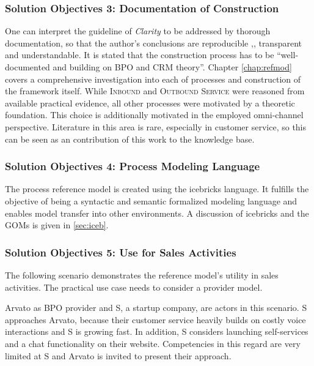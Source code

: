 \subsubsection{Solution Objectives 3: Documentation of Construction}
One can interpret the guideline of \textit{Clarity} to be addressed by thorough documentation, so that the author's conclusions are reproducible ,\eg, transparent and understandable.  
It is stated that the construction process has to be \enquote{well-documented and building on \acrshort{BPO} and \acrshort{CRM} theory}. Chapter \ref{chap:refmod} covers a comprehensive investigation into each of processes and construction of the framework itself. While \textsc{Inbound} and \textsc{Outbound Service} were reasoned from available practical evidence, all other processes were motivated by a theoretic foundation. This choice is additionally motivated in the employed omni-channel perspective. Literature in this area is rare, especially in customer service, so this can be seen as an  contribution of this work to the knowledge base. 

\subsubsection{Solution Objectives 4: Process Modeling Language }
The process reference model is created using the icebricks language. It fulfills the objective of being a syntactic and semantic formalized modeling language and enables model transfer into other environments. A discussion of icebricks and the \acrshort{GOM}s is given in \ref{sec:iceb}. 

\subsubsection{Solution Objectives 5: Use for Sales Activities}

The following scenario demonstrates the reference model's utility in sales activities. The practical use case needs to consider a provider model.  

Arvato as BPO provider and S, a startup company, are actors in this scenario. S approaches Arvato, because their customer service heavily builds on costly voice interactions and S is growing fast. In addition, S considers launching self-services and a chat functionality on their website. Competencies in this regard are very limited at S and Arvato is invited to present their approach. 

